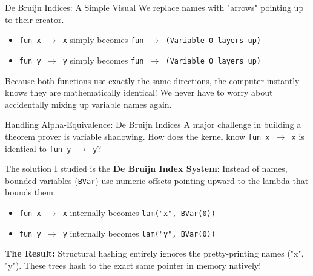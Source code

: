 \documentclass[aspectratio=169, 10pt]{beamer}
\begin{document}
\begin{frame}[fragile]{De Bruijn Indices: A Simple Visual}
    We replace names with "arrows" pointing up to their creator.
    
    \vspace{1em}
    \begin{itemize}
        \item \texttt{fun x $\rightarrow$ x} simply becomes \texttt{fun $\rightarrow$ (Variable 0 layers up)}
        \item \texttt{fun y $\rightarrow$ y} simply becomes \texttt{fun $\rightarrow$ (Variable 0 layers up)}
    \end{itemize}
    
    \vspace{1em}
    Because both functions use exactly the same directions, the computer instantly knows they are mathematically identical! We never have to worry about accidentally mixing up variable names again.
\end{frame}

\begin{frame}[fragile]{Handling Alpha-Equivalence: De Bruijn Indices}
    A major challenge in building a theorem prover is variable shadowing. How does the kernel know \texttt{fun x $\rightarrow$ x} is identical to \texttt{fun y $\rightarrow$ y}?
    
    \vspace{0.5em}
    The solution I studied is the \textbf{De Bruijn Index System}:
    Instead of names, bounded variables (\texttt{BVar}) use numeric offsets pointing upward to the lambda that bounds them.
    
    \vspace{0.5em}
    \begin{itemize}
        \item \texttt{fun x $\rightarrow$ x} internally becomes \texttt{lam("x", BVar(0))}
        \item \texttt{fun y $\rightarrow$ y} internally becomes \texttt{lam("y", BVar(0))}
    \end{itemize}
    
    \vspace{0.5em}
    \textbf{The Result:} Structural hashing entirely ignores the pretty-printing names ("x", "y"). These trees hash to the exact same pointer in memory natively!
\end{frame}
\end{document}
